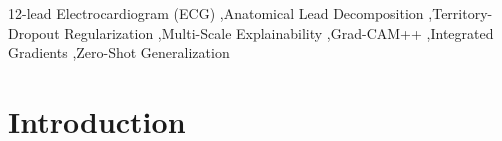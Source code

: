 \documentclass[12pt]{elsarticle}
\begin{document}
\begin{frontmatter}
\begin{abstract}
and Normal controls ($N=963$) demonstrate balanced physiological equilibrium ($\Delta P = 0.117$). External zero-shot validation on 6,877 CPSC2018 records confirms robust out-of-distribution transferability (Macro ROC-AUC = \textbf{0.7849}, Normal Sinus Rhythm = \textbf{0.9049}).
\end{abstract}



\begin{keyword}
12-lead Electrocardiogram (ECG) \sep Anatomical Lead Decomposition \sep Territory-Dropout Regularization \sep Multi-Scale Explainability \sep Grad-CAM++ \sep Integrated Gradients \sep Zero-Shot Generalization
\end{keyword}

\end{frontmatter}

\section{Introduction}
\label{sec:intro}
\end{document}
